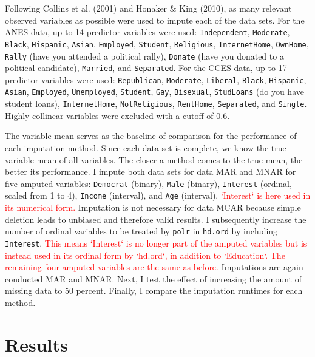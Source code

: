\documentclass[12pt,econ]{sources/authesis}
\begin{document}
Following Collins et al. (2001) and Honaker \& King (2010), as many relevant observed variables as possible were used to impute each of the data sets. For the ANES data, up to 14 predictor variables were used: \texttt{Independent}, \texttt{Moderate}, \texttt{Black}, \texttt{Hispanic}, \texttt{Asian}, \texttt{Employed}, \texttt{Student}, \texttt{Religious}, \texttt{InternetHome}, \texttt{OwnHome}, \texttt{Rally} (have you attended a political rally), \texttt{Donate} (have you donated to a political candidate), \texttt{Married}, and \texttt{Separated}. For the CCES data, up to 17 predictor variables were used: \texttt{Republican}, \texttt{Moderate}, \texttt{Liberal}, \texttt{Black}, \texttt{Hispanic}, \texttt{Asian}, \texttt{Employed}, \texttt{Unemployed}, \texttt{Student}, \texttt{Gay}, \texttt{Bisexual}, \texttt{StudLoans} (do you have student loans), \texttt{InternetHome}, \texttt{NotReligious}, \texttt{RentHome}, \texttt{Separated}, and \texttt{Single}. Highly collinear variables were excluded with a cutoff of 0.6.

The variable mean serves as the baseline of comparison for the performance of each imputation method. Since each data set is complete, we know the true variable mean of all variables. The closer a method comes to the true mean, the better its performance. I impute both data sets for data MAR and MNAR for five amputed variables: \texttt{Democrat} (binary), \texttt{Male} (binary), \texttt{Interest} (ordinal, scaled from 1 to 4), \texttt{Income} (interval), and \texttt{Age} (interval). \textcolor{red}{`Interest` is here used in its numerical form.} Imputation is not necessary for data MCAR because simple deletion leads to unbiased and therefore valid results. I subsequently increase the number of ordinal variables to be treated by \texttt{polr} in \texttt{hd.ord} by including \texttt{Interest}. \textcolor{red}{This means `Interest` is no longer part of the amputed variables but is instead used in its ordinal form by `hd.ord`, in addition to `Education`. The remaining four amputed variables are the same as before.} Imputations are again conducted MAR and MNAR. Next, I test the effect of increasing the amount of missing data to 50 percent. Finally, I compare the imputation runtimes for each method.

\hypertarget{ordmiss-results}{%
\section{Results}\label{ordmiss-results}}
\end{document}
